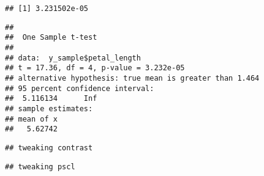 \documentclass[
  oneside]{book}
\newenvironment{Shaded}{\begin{snugshade}}{\end{snugshade}}
\newcommand{\AttributeTok}[1]{\textcolor[rgb]{0.77,0.63,0.00}{#1}}
\newcommand{\CommentTok}[1]{\textcolor[rgb]{0.56,0.35,0.01}{\textit{#1}}}
\newcommand{\FunctionTok}[1]{\textcolor[rgb]{0.00,0.00,0.00}{#1}}
\newcommand{\NormalTok}[1]{#1}
\newcommand{\SpecialCharTok}[1]{\textcolor[rgb]{0.00,0.00,0.00}{#1}}
\newcommand{\StringTok}[1]{\textcolor[rgb]{0.31,0.60,0.02}{#1}}
\begin{document}
\begin{verbatim}
## [1] 3.231502e-05
\end{verbatim}

\begin{Shaded}
\end{Shaded}

\begin{verbatim}
## 
##  One Sample t-test
## 
## data:  y_sample$petal_length
## t = 17.36, df = 4, p-value = 3.232e-05
## alternative hypothesis: true mean is greater than 1.464
## 95 percent confidence interval:
##  5.116134      Inf
## sample estimates:
## mean of x 
##   5.62742
\end{verbatim}

\begin{verbatim}
## tweaking contrast
\end{verbatim}

\begin{verbatim}
## tweaking pscl
\end{verbatim}

  
\end{document}

